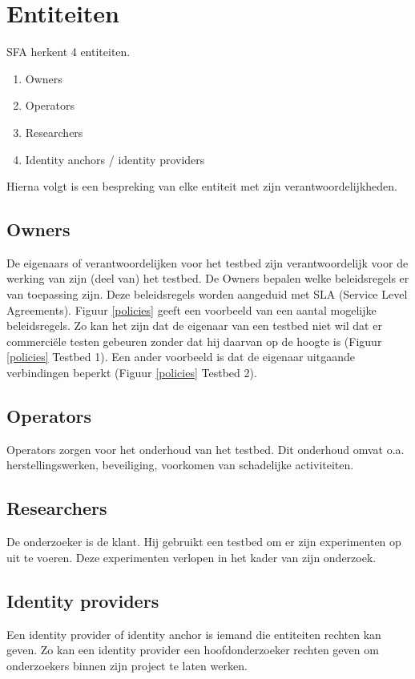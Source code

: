 \section{Entiteiten}
\npar
SFA herkent 4 entiteiten.
\begin{enumerate}
\item Owners
\item Operators
\item Researchers
\item Identity anchors / identity providers
\end{enumerate}
Hierna volgt is een bespreking van elke entiteit met zijn verantwoordelijkheden.

\subsection{Owners}
\npar
De eigenaars of verantwoordelijken voor het testbed zijn verantwoordelijk voor de werking van zijn (deel van) het testbed. De Owners bepalen welke beleidsregels er van toepassing zijn. Deze beleidsregels worden aangeduid met SLA (Service Level Agreements). Figuur \ref{policies} geeft een voorbeeld van een aantal mogelijke beleidsregels. Zo kan het zijn dat de eigenaar van een testbed niet wil dat er commerci\"ele testen gebeuren zonder dat hij daarvan op de hoogte is (Figuur \ref{policies} Testbed 1). Een ander voorbeeld is dat de eigenaar uitgaande verbindingen beperkt (Figuur \ref{policies} Testbed 2).

\subsection{Operators}
\npar
Operators zorgen voor het onderhoud van het testbed. Dit onderhoud omvat o.a. herstellingswerken, beveiliging, voorkomen van schadelijke activiteiten.

\subsection{Researchers}
\npar
De onderzoeker is de klant. Hij gebruikt een testbed om er zijn experimenten op uit te voeren. Deze experimenten verlopen in het kader van zijn onderzoek.

\subsection{Identity providers}
\npar
Een identity provider of identity anchor is iemand die entiteiten rechten kan geven. Zo kan een identity provider een hoofdonderzoeker rechten geven om onderzoekers binnen zijn project te laten werken.

